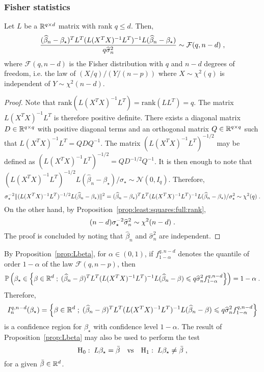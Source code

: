 \subsubsection*{Fisher statistics}
\begin{shaded}
\begin{proposition}
\label{prop:Lbeta}
Let $L$ be a $\mathbb{R}^{q\times d}$ matrix with rank $q\leqslant d$. Then,
\[
\frac{(\widehat \beta_{n} -\beta_{\star})^TL^T(L(X^TX)^{-1}L^T)^{-1}L(\widehat \beta_{n} -\beta_{\star})}{q\widehat\sigma^2_{n}} \sim \mathcal{F}(q,n-d)\;,
\]
where $\mathcal{F}(q,n-d)$ is the Fisher distribution with $q$ and $n-d$ degrees of freedom, i.e. the law of $(X/q)/(Y/(n-p))$ where $X\sim\chi^2(q)$ is independent of $Y\sim\chi^2(n-d)$.
\end{proposition}
\end{shaded}
\begin{proof}
Note that $\mathrm{rank}(L(X^TX)^{-1}L^T) = \mathrm{rank}(LL^T)  = q$. The matrix $L(X^TX)^{-1}L^T$ is therefore positive definite. There exists a diagonal matrix $D\in\mathbb{R}^{q\times q}$ with positive diagonal terms and an orthogonal matrix $Q\in\mathbb{R}^{q\times q}$ such that $L(X^TX)^{-1}L^T = QDQ^{-1}$. The matrix $(L(X^TX)^{-1}L^T)^{-1/2}$ may be defined as $(L(X^TX)^{-1}L^T)^{-1/2} = QD^{-1/2}Q^{-1}$. It is then enough to note that $(L(X^TX)^{-1}L^T)^{-1/2}L(\widehat \beta_{n} -\beta_{\star})/\sigma_{\star}\sim \mathcal{N}(0,I_q)$. Therefore,
\[
\sigma^{-2}_{\star}\|(L(X^TX)^{-1}L^T)^{-1/2}L(\widehat \beta_{n} -\beta_{\star})\|^2 = (\widehat \beta_{n} -\beta_{\star})^TL^T(L(X^TX)^{-1}L^T)^{-1}L(\widehat \beta_{n} -\beta_{\star})/\sigma^2_{\star} \sim \chi^2(q)\;.
\]
On the other hand, by Proposition~\ref{prop:least:squares:full:rank}, 
\[
(n-d)\sigma^{-2}_{\star}\widehat\sigma^2_{n} \sim \chi^2(n-d)\;.
\]
The proof is concluded by noting that $\widehat \beta_n$ and  $\widehat\sigma^2_{n}$ are independent.
\end{proof}
By Proposition~\ref{prop:Lbeta}, for $\alpha\in(0,1)$, if $f_{1-\alpha}^{q,n-d}$ denotes the quantile of order $1-\alpha$ of the law $\mathcal{F}(q,n-p)$, then 
\[
\mathbb{P}\left(\beta_{\star}\in \left\{\beta\in\mathbb{R}^d\;;\; (\widehat \beta_{n} -\beta)^TL^T(L(X^TX)^{-1}L^T)^{-1}L(\widehat \beta_{n} -\beta)\leqslant q\widehat\sigma^2_{n}f_{1-\alpha}^{q,n-d}\right\}\right) = 1-\alpha\;.
\]
Therefore, 
\[
I^{q,n-d}_{n}(\beta_{\star}) = \left\{\beta\in\mathbb{R}^d\;;\; (\widehat \beta_{n} -\beta)^TL^T(L(X^TX)^{-1}L^T)^{-1}L(\widehat \beta_{n} -\beta)\leqslant q\widehat\sigma^2_{n}f_{1-\alpha}^{q,n-d}\right\}
\]
 is a confidence region for $\beta_{\star}$ with confidence level $1-\alpha$. The result of Proposition~\ref{prop:Lbeta} may also be used to perform the test 
\[
\mathrm{H}_0:\; L\beta_{\star} = \bar\beta \quad\mathrm{vs} \quad \mathrm{H}_1:\; L\beta_{\star} \neq \bar \beta\;,
\]
for a given $\bar \beta \in\mathbb{R}^d$.


